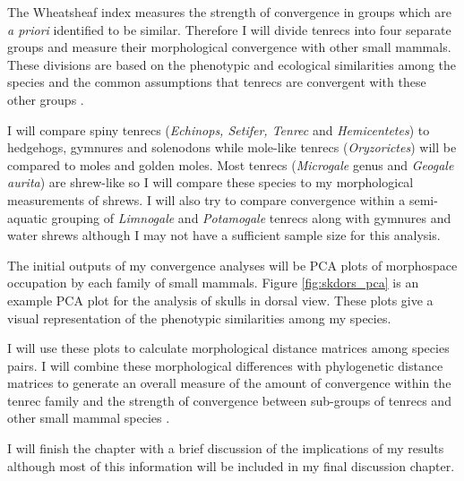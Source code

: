 \documentclass[12pt,a4paper]{article}
\begin{document}
	The Wheatsheaf index \citep{Arbuckle2014} measures the strength of convergence in groups which are \textit{a priori} identified to be similar. Therefore I will divide tenrecs into four separate groups and measure their morphological convergence with other small mammals. These divisions are based on the phenotypic and ecological similarities among the species and the common assumptions that tenrecs are convergent with these other groups \citep[e.g.][]{Soarimalala2011, Olson2013}. 
	
	I will compare spiny tenrecs (\textit{Echinops, Setifer, Tenrec} and \textit{Hemicentetes}) to hedgehogs, gymnures and solenodons while mole-like tenrecs (\textit{Oryzorictes}) will be compared to moles and golden moles. Most tenrecs (\textit{Microgale} genus and \textit{Geogale aurita}) are shrew-like so I will compare these species to my morphological measurements of shrews. I will also try to compare convergence within a semi-aquatic grouping of \textit{Limnogale} and \textit{Potamogale} tenrecs along with gymnures and water shrews although I may not have a sufficient sample size for this analysis. 
	
	The initial outputs of my convergence analyses will be PCA plots of morphospace occupation by each family of small mammals. Figure \ref{fig:skdors_pca} is an example PCA plot for the analysis of skulls in dorsal view. These plots give a visual representation of the phenotypic similarities among my species.

	I will use these plots to calculate morphological distance matrices among species pairs. I will combine these morphological differences with phylogenetic distance matrices to generate an overall measure of the amount of convergence within the tenrec family \citep{Stayton2008} and the strength of convergence between sub-groups of tenrecs and other small mammal species \citep{Arbuckle2014}.
	
	I will finish the chapter with a brief discussion of the implications of my results although most of this information will be included in my final discussion chapter.
	
\end{document}

